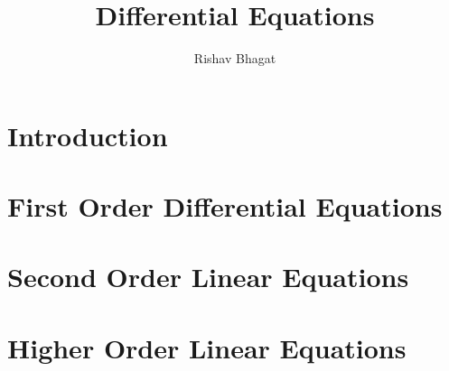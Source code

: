 \title{Differential Equations}

\author{Rishav Bhagat}

\maketitle
\chapter{Introduction}
    
    
    
\chapter{First Order Differential Equations}
    
    
    
    
    \graphicspath{{../chapter_2/section_2.5/}}
    
    
    \graphicspath{{../chapter_2/section_2.7/}}
    
    \graphicspath{{../chapter_2/section_2.8/}}
    
    \graphicspath{{../chapter_2/section_2.9/}}
    
\chapter{Second Order Linear Equations}
    \graphicspath{{../chapter_3/section_3.1/}}
    
    \graphicspath{{../chapter_3/section_3.2/}}
    
    \graphicspath{{../chapter_3/section_3.3/}}
    
    
    \graphicspath{{../chapter_3/section_3.5/}}
    
    
\chapter{Higher Order Linear Equations}
    
    
    
    
